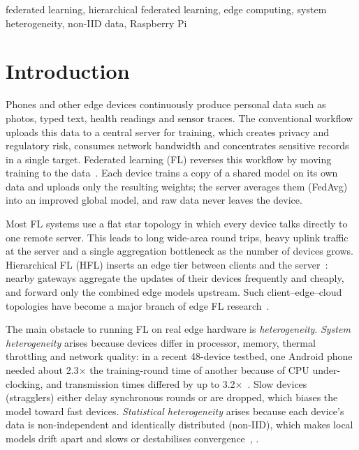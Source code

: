 \documentclass[conference]{IEEEtran}
\begin{document}
\begin{IEEEkeywords}
federated learning, hierarchical federated learning, edge computing, system heterogeneity, non-IID data, Raspberry Pi
\end{IEEEkeywords}

\section{Introduction}

Phones and other edge devices continuously produce personal data such as photos, typed text, health readings and sensor traces. The conventional workflow uploads this data to a central server for training, which creates privacy and regulatory risk, consumes network bandwidth and concentrates sensitive records in a single target. Federated learning (FL) reverses this workflow by moving training to the data~\cite{mcmahan2017}. Each device trains a copy of a shared model on its own data and uploads only the resulting weights; the server averages them (FedAvg) into an improved global model, and raw data never leaves the device.

Most FL systems use a flat star topology in which every device talks directly to one remote server. This leads to long wide-area round trips, heavy uplink traffic at the server and a single aggregation bottleneck as the number of devices grows. Hierarchical FL (HFL) inserts an edge tier between clients and the server~\cite{liu2020}: nearby gateways aggregate the updates of their devices frequently and cheaply, and forward only the combined edge models upstream. Such client--edge--cloud topologies have become a major branch of edge FL research~\cite{wu2024survey}.

The main obstacle to running FL on real edge hardware is \emph{heterogeneity}. \emph{System heterogeneity} arises because devices differ in processor, memory, thermal throttling and network quality: in a recent 48-device testbed, one Android phone needed about 2.3$\times$ the training-round time of another because of CPU under-clocking, and transmission times differed by up to 3.2$\times$~\cite{bozic2024}. Slow devices (stragglers) either delay synchronous rounds or are dropped, which biases the model toward fast devices. \emph{Statistical heterogeneity} arises because each device's data is non-independent and identically distributed (non-IID), which makes local models drift apart and slows or destabilises convergence~\cite{li2020fedprox}, \cite{fang2024mtgc}.
\end{document}
